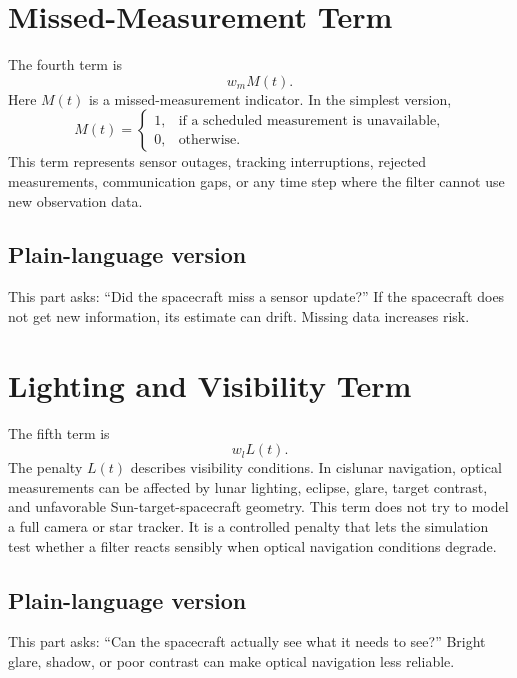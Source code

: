 \documentclass[11pt]{article}
\begin{document}
\section{Missed-Measurement Term}

The fourth term is
\begin{equation}
  w_m M(t).
\end{equation}
Here $M(t)$ is a missed-measurement indicator. In the simplest version,
\begin{equation}
M(t)=
\begin{cases}
1, & \text{if a scheduled measurement is unavailable},\\
0, & \text{otherwise}.
\end{cases}
\end{equation}
This term represents sensor outages, tracking interruptions, rejected
measurements, communication gaps, or any time step where the filter cannot use
new observation data.

\subsection*{Plain-language version}

This part asks: ``Did the spacecraft miss a sensor update?'' If the spacecraft
does not get new information, its estimate can drift. Missing data increases
risk.

\section{Lighting and Visibility Term}

The fifth term is
\begin{equation}
  w_l L(t).
\end{equation}
The penalty $L(t)$ describes visibility conditions. In cislunar navigation,
optical measurements can be affected by lunar lighting, eclipse, glare, target
contrast, and unfavorable Sun-target-spacecraft geometry. This term does not
try to model a full camera or star tracker. It is a controlled penalty that
lets the simulation test whether a filter reacts sensibly when optical
navigation conditions degrade.

\subsection*{Plain-language version}

This part asks: ``Can the spacecraft actually see what it needs to see?''
Bright glare, shadow, or poor contrast can make optical navigation less
reliable.
\end{document}
